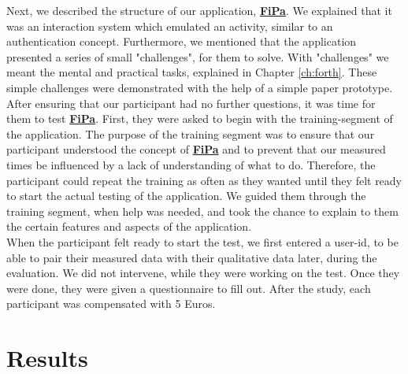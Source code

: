Next, we described the structure of our application, \underline{\textbf{FiPa}}. We explained that it was an interaction system which emulated an activity, similar to an authentication concept. Furthermore, we mentioned that the application presented a series of small "challenges", for them to solve. With "challenges" we meant the mental and practical tasks, explained in Chapter \ref{ch:forth}. These simple challenges were demonstrated with the help of a simple paper prototype.\\

After ensuring that our participant had no further questions, it was time for them to test \underline{\textbf{FiPa}}. First, they were asked to begin with the training-segment of the application. The purpose of the training segment was to ensure that our participant understood the concept of \underline{\textbf{FiPa}} and to prevent that our measured times be influenced by a lack of understanding of what to do. Therefore, the participant could repeat the training as often as they wanted until they felt ready to start the actual testing of the application. We guided them through the training segment, when help was needed, and took the chance to explain to them the certain features and aspects of the application. \\


When the participant felt ready to start the test, we first entered a user-id, to be able to pair their measured data with their qualitative data later, during the evaluation. We did not intervene, while they were working on the test. Once they were done, they were given a questionnaire to fill out. After the study, each participant was compensated with 5 Euros.

\section{Results}

